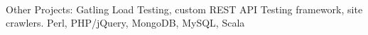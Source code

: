 \begin{position}
  \paragraph{} Other Projects: Gatling Load Testing, custom REST API Testing framework, site crawlers. Perl, PHP/jQuery, MongoDB, MySQL, Scala
\end{position}
%
